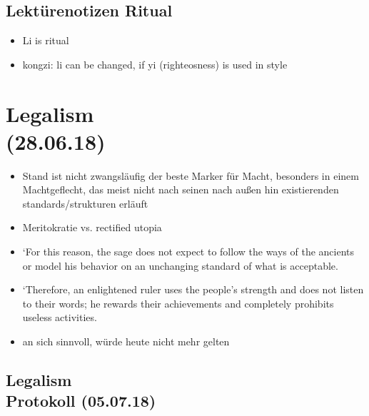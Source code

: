\documentclass[emulatestandardclasses]{scrartcl}
\begin{document}
\subsection{Lektürenotizen Ritual}

\begin{itemize}
  \item Li is ritual
  \item kongzi: li can be changed, if yi (righteosness) is used in style
\end{itemize}


\section{Legalism\\(28.06.18)}

\begin{itemize}
  \item Stand ist nicht zwangsläufig der beste Marker für Macht, besonders in einem Machtgeflecht, das meist nicht nach seinen nach außen hin existierenden standards/strukturen erläuft
  \item Meritokratie vs. rectified utopia
  \item `For this reason, the sage does not expect to follow the ways of the ancients or model his behavior on an unchanging standard of what is acceptable. 
  \item `Therefore, an enlightened ruler uses the people’s strength and does not listen to their words; he rewards their achievements and completely prohibits useless activities. 
  \item an sich sinnvoll, würde heute nicht mehr gelten
\end{itemize}


\subsection{Legalism\\Protokoll (05.07.18)}
\end{document}
